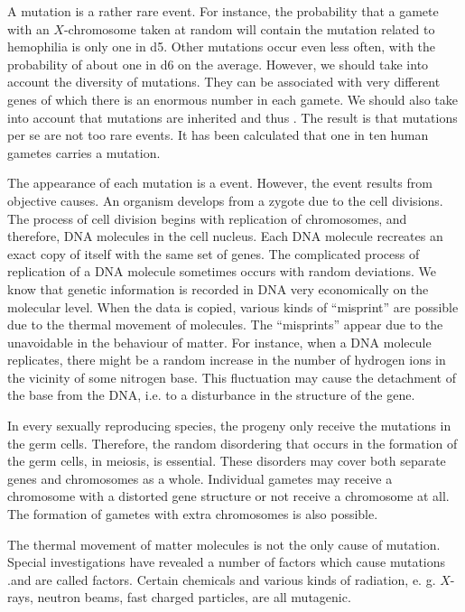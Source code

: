  A mutation is a rather rare event. For
instance, the probability that a gamete with an $X$-chromosome taken at
random will contain the mutation related to hemophilia is only one in
\num{d5}. Other mutations occur even less often, with the probability of about one in \num{d6} on the average. However, we should take into account the diversity of mutations. They can be associated with very different genes
of which there is an enormous number in each gamete. We should also
take into account that mutations are inherited and thus . The
result is that mutations per se are not too rare events. It has been
calculated that one in ten human gametes carries a mutation.

The appearance of each mutation is a  event. However, the
event results from objective causes. An organism develops from a zygote
due to the cell divisions. The process of cell division begins with
replication of chromosomes, and therefore, DNA molecules in the cell
nucleus. Each DNA molecule recreates an exact copy of itself with the
same set of genes. The complicated process of replication of a DNA
molecule sometimes occurs with random deviations. We know that
genetic information is recorded in DNA very economically on the
molecular level. When the data is copied, various kinds of ``misprint'' are
possible due to the thermal movement of molecules. The ``misprints''
appear due to the unavoidable  in the behaviour of matter. For instance, when a DNA molecule replicates, there might be
a random increase in the number of hydrogen ions in the vicinity of
some nitrogen base. This fluctuation may cause the detachment of the
base from the DNA, i.e. to a disturbance in the structure of the gene.

In every sexually reproducing species, the progeny only receive the
mutations in the germ cells. Therefore, the random disordering that
occurs in the formation of the germ cells, in meiosis, is essential. These
disorders may cover both separate genes and chromosomes as a whole.
Individual gametes may receive a chromosome with a distorted gene
structure or not receive a chromosome at all. The formation of gametes
with extra chromosomes is also possible.


The thermal movement of matter molecules is not the only cause of
mutation. Special investigations have revealed a number of 
factors which cause mutations .and are called  factors. Certain
chemicals and various kinds of radiation, e. g. $X$-rays, neutron beams,
fast charged particles, are all mutagenic.


